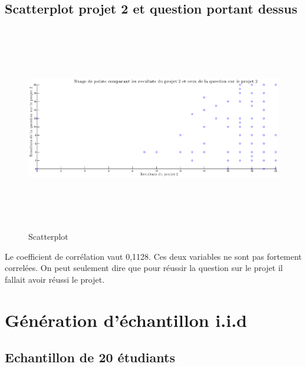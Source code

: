 \documentclass[a4paper, 11pt]{article}
\begin{document}
\subsection{Scatterplot projet 2 et question portant dessus}
\begin{figure} [H]
	\begin{center}
		\includegraphics[height=9cm, width = 16cm]{Fig/Q1E.eps}
				\caption{Scatterplot}
		\label{Q1E}
	\end{center}
\end{figure}
Le coefficient de corrélation vaut 0,1128. Ces deux variables ne sont pas fortement correlées. On peut seulement dire que pour réussir la question sur le projet il fallait avoir réussi le projet.
   \section{Génération d'échantillon i.i.d}
   \subsection{Echantillon de 20 étudiants}
\end{document}
